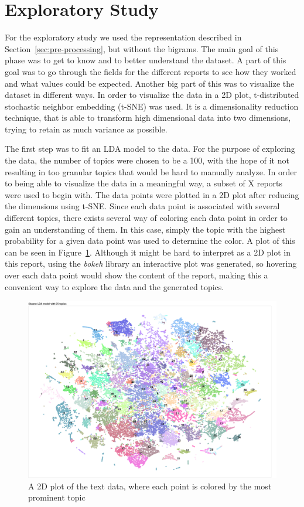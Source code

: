 \section{Exploratory Study}\label{sec:exploratory-study}
For the exploratory study we used the representation described in Section~\ref{sec:pre-processing}, but without the bigrams.
The main goal of this phase was to get to know and to better understand the dataset.
A part of this goal was to go through the fields for the different reports to see how they worked and what values could be expected.
Another big part of this was to visualize the dataset in different ways.
In order to visualize the data in a 2D plot, t-distributed stochastic neighbor embedding (t-SNE) was used.
It is a dimensionality reduction technique, that is able to transform high dimensional data into two dimensions, trying to retain as much variance as possible.

The first step was to fit an LDA model to the data.
For the purpose of exploring the data, the number of topics were chosen to be a 100, with the hope of it not resulting in too granular topics that would be hard to manually analyze. %
In order to being able to visualize the data in a meaningful way, a subset of X reports were used to begin with.
The data points were plotted in a 2D plot after reducing the dimensions using t-SNE.
Since each data point is associated with several different topics, there exists several way of coloring each data point in order to gain an understanding of them.
In this case, simply the topic with the highest probability for a given data point was used to determine the color.
A plot of this can be seen in Figure~\ref{fig:lda-dist}.
Although it might be hard to interpret as a 2D plot in this report, using the \textit{bokeh} library an interactive plot was generated, so hovering over each data point would show the content of the report, making this a convenient way to explore the data and the generated topics.

\begin{figure}
    \centering
    \includegraphics[scale=0.25]{figures/lda-2d-distribution.png}
    \caption{A 2D plot of the text data, where each point is colored by the most prominent topic}
    \label{fig:lda-dist}
\end{figure}

